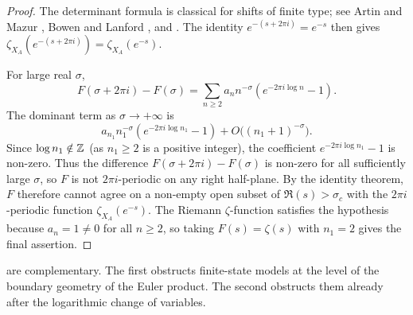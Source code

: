 \begin{proof}
  The determinant formula is classical for shifts of finite type; see
  Artin and Mazur \cite{ArtinMazur1965}, Bowen and Lanford
  \cite{BowenLanford1970}, and
  \cite[Chapter~6]{LindMarcus1995}. The identity
  \(e^{-(s+2\pi i)}=e^{-s}\) then gives
  \(\zeta_{X_A}(e^{-(s+2\pi i)})=\zeta_{X_A}(e^{-s})\).

  For large real \(\sigma\),
  \[
    F(\sigma+2\pi i)-F(\sigma)
    =\sum_{n\ge 2}a_n n^{-\sigma}(e^{-2\pi i\log n}-1).
  \]
  The dominant term as \(\sigma\to+\infty\) is
  \[
    a_{n_1}n_1^{-\sigma}(e^{-2\pi i\log n_1}-1)+O\!\bigl((n_1+1)^{-\sigma}\bigr).
  \]
  Since \(\log n_1\notin\mathbb{Z}\) (as \(n_1\ge 2\) is a positive integer),
  the coefficient \(e^{-2\pi i\log n_1}-1\) is non-zero. Thus the
  difference \(F(\sigma+2\pi i)-F(\sigma)\) is non-zero for all
  sufficiently large \(\sigma\), so \(F\) is not \(2\pi i\)-periodic on
  any right half-plane. By the identity theorem, \(F\) therefore cannot
  agree on a non-empty open subset of \(\Re(s)>\sigma_c\) with the
  \(2\pi i\)-periodic function \(\zeta_{X_A}(e^{-s})\). The Riemann
  \(\zeta\)-function satisfies the hypothesis because \(a_n=1\neq 0\)
  for all \(n\ge 2\), so taking \(F(s)=\zeta(s)\) with \(n_1=2\) gives
  the final assertion.
\end{proof}

\begin{remark}
  are complementary. The first obstructs finite-state models at the
  level of the boundary geometry of the Euler product. The second
  obstructs them already after the logarithmic change of variables.
\end{remark}
